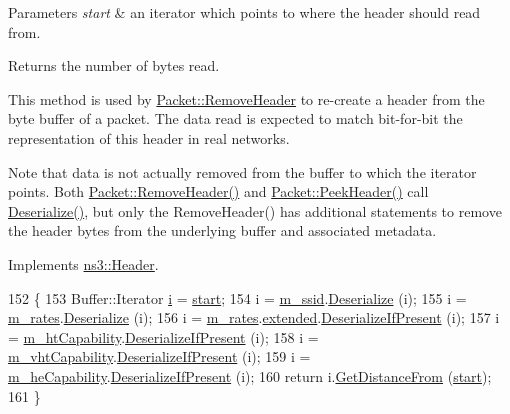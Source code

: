 \begin{DoxyParams}{Parameters}
{\em start} & an iterator which points to where the header should read from. \\
\hline
\end{DoxyParams}
\begin{DoxyReturn}{Returns}
the number of bytes read.
\end{DoxyReturn}
This method is used by \hyperlink{classns3_1_1Packet_a0961eccf975d75f902d40956c93ba63e}{Packet\+::\+Remove\+Header} to re-\/create a header from the byte buffer of a packet. The data read is expected to match bit-\/for-\/bit the representation of this header in real networks.

Note that data is not actually removed from the buffer to which the iterator points. Both \hyperlink{classns3_1_1Packet_a0961eccf975d75f902d40956c93ba63e}{Packet\+::\+Remove\+Header()} and \hyperlink{classns3_1_1Packet_aadc63487bea70945c418f4c3e9b81964}{Packet\+::\+Peek\+Header()} call \hyperlink{classns3_1_1MgtProbeRequestHeader_a622524bcbe9ec5ba9bea8e83c43302db}{Deserialize()}, but only the Remove\+Header() has additional statements to remove the header bytes from the underlying buffer and associated metadata. 

Implements \hyperlink{classns3_1_1Header_a78be9400bb66b2a8543606f395ef5396}{ns3\+::\+Header}.


\begin{DoxyCode}
152 \{
153   Buffer::Iterator \hyperlink{bernuolliDistribution_8m_a6f6ccfcf58b31cb6412107d9d5281426}{i} = \hyperlink{namespacevisualizer_1_1core_a2a35e5d8a34af358b508dac8635754e0}{start};
154   i = \hyperlink{classns3_1_1MgtProbeRequestHeader_a3bf06be379f216965c5534bb19d21fc1}{m\_ssid}.\hyperlink{classns3_1_1WifiInformationElement_a533a553c7a33a4870f1819b25d43d15b}{Deserialize} (i);
155   i = \hyperlink{classns3_1_1MgtProbeRequestHeader_a82d1da521d934e187f00b38867f244d3}{m\_rates}.\hyperlink{classns3_1_1WifiInformationElement_a533a553c7a33a4870f1819b25d43d15b}{Deserialize} (i);
156   i = \hyperlink{classns3_1_1MgtProbeRequestHeader_a82d1da521d934e187f00b38867f244d3}{m\_rates}.\hyperlink{classns3_1_1SupportedRates_a313f3392cbf8248cf2822d53f3914aaf}{extended}.\hyperlink{classns3_1_1WifiInformationElement_a8ce15156403cf18af657c4bee2e071aa}{DeserializeIfPresent} (i);
157   i = \hyperlink{classns3_1_1MgtProbeRequestHeader_a90020bd13c4ddb5b4bb94b734e523cef}{m\_htCapability}.\hyperlink{classns3_1_1WifiInformationElement_a8ce15156403cf18af657c4bee2e071aa}{DeserializeIfPresent} (i);
158   i = \hyperlink{classns3_1_1MgtProbeRequestHeader_acfd190373f8c431aa709e18d44fb368f}{m\_vhtCapability}.\hyperlink{classns3_1_1WifiInformationElement_a8ce15156403cf18af657c4bee2e071aa}{DeserializeIfPresent} (i);
159   i = \hyperlink{classns3_1_1MgtProbeRequestHeader_a4b65c6f1e5d8da451bd4e84f2ddda08d}{m\_heCapability}.\hyperlink{classns3_1_1WifiInformationElement_a8ce15156403cf18af657c4bee2e071aa}{DeserializeIfPresent} (i);
160   \textcolor{keywordflow}{return} i.\hyperlink{classns3_1_1Buffer_1_1Iterator_a90ff2512ad02e7449ace678d0aaf672a}{GetDistanceFrom} (\hyperlink{namespacevisualizer_1_1core_a2a35e5d8a34af358b508dac8635754e0}{start});
161 \}
\end{DoxyCode}


